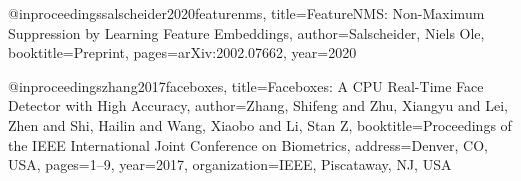 @inproceedings{salscheider2020featurenms,
  title={{{FeatureNMS: Non-Maximum Suppression by Learning Feature Embeddings}}},
  author={Salscheider, Niels Ole},
  booktitle={Preprint},
  pages={arXiv:2002.07662},
  year={2020}
}

@inproceedings{zhang2017faceboxes,
  title={{{Faceboxes: A CPU Real-Time Face Detector with High Accuracy}}},
  author={Zhang, Shifeng and Zhu, Xiangyu and Lei, Zhen and Shi, Hailin and Wang, Xiaobo and Li, Stan Z},
  booktitle={Proceedings of the IEEE International Joint Conference on Biometrics},
  address={Denver, CO, USA},
  pages={1--9},
  year={2017},
  organization={IEEE, Piscataway, NJ, USA}
}

